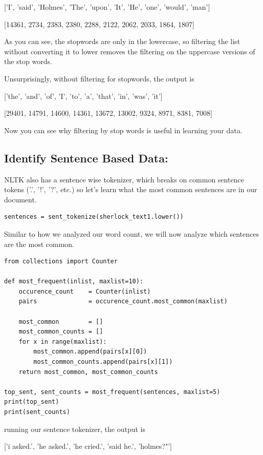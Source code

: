 \documentclass{article}
\begin{document}
['I', 'said', 'Holmes', 'The', 'upon', 'It', 'He', 'one', 'would', 'man']

[14361, 2734, 2383, 2380, 2288, 2122, 2062, 2033, 1864, 1807]

As you can see, the stopwords are only in the lowercase, so filtering the list without converting it to lower removes the filtering on the uppercase versions of the stop words. 

Unsurprisingly, without filtering for stopwords, the output is 

['the', 'and', 'of', 'I', 'to', 'a', 'that', 'in', 'was', 'it']

[29401, 14791, 14600, 14361, 13672, 13002, 9324, 8971, 8381, 7008]

Now you can see why filtering by stop words is useful in learning your data.

\subsection{Identify Sentence Based Data:}

NLTK also has a sentence wise tokenizer, which breaks on common sentence tokens ('.', '!', '?', etc.) so let's learn what the most common sentences are in our document.

\begin{verbatim}
sentences = sent_tokenize(sherlock_text1.lower())
\end{verbatim}

Similar to how we analyzed our word count, we will now analyze which sentences are the most common. 

\begin{verbatim}
from collections import Counter

def most_frequent(inlist, maxlist=10):
    occurence_count    = Counter(inlist)
    pairs              = occurence_count.most_common(maxlist)

    most_common        = []
    most_common_counts = []
    for x in range(maxlist):
        most_common.append(pairs[x][0])
        most_common_counts.append(pairs[x][1])
    return most_common, most_common_counts

top_sent, sent_counts = most_frequent(sentences, maxlist=5)
print(top_sent)
print(sent_counts)
\end{verbatim}

running our sentence tokenizer, the output is 

['i asked.', 'he asked.', 'he cried.', 'said he.', 'holmes?"']
\end{document}
